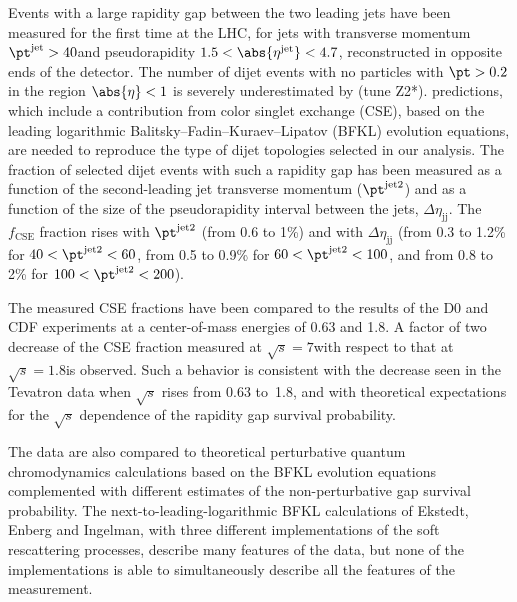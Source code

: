 \documentclass[11pt,twoside,a4paper,cmspaper,final,collab]{cms-tdr}
\begin{document}
Events with a large rapidity gap between the two leading jets have been measured for the first time at the LHC, for jets with transverse momentum $\pt^{\text{jet}}>40$\GeV and pseudorapidity $1.5<\abs{\eta^{\text{jet}}}<4.7$, reconstructed in opposite ends of the detector. The number of dijet events with no particles with $\pt>0.2$\GeV in the region $\abs{\eta}<1$ is severely underestimated by  (tune Z2*).  predictions, which include a contribution from color singlet exchange (CSE), based on the leading logarithmic Balitsky--Fadin--Kuraev--Lipatov (BFKL) evolution equations, are needed to reproduce the type of dijet topologies selected in our analysis. The fraction of selected dijet events with  such a rapidity gap has been measured as a function of the second-leading jet transverse momentum ($\pt^\text{jet2}$) and as a function of the size of the pseudorapidity interval between the jets, $\Delta\eta_\mathrm{jj}$. The $f_\mathrm{CSE}$  fraction rises with $\pt^\text{jet2}$ (from 0.6 to 1\%) and with $\Delta\eta_\mathrm{jj}$ (from 0.3 to 1.2\% for $40<\pt^\text{jet2}<60$\GeV, from 0.5 to 0.9\% for $60<\pt^\text{jet2}<100$\GeV, and from 0.8 to 2\% for $100<\pt^\text{jet2}<200$\GeV).

The measured CSE fractions have been compared to the results of the D0 and CDF experiments at a center-of-mass energies of 0.63 and 1.8\TeV. A factor of two decrease of the CSE fraction measured at $\sqrt{s} = 7$\TeV with respect to that at $\sqrt{s} = 1.8$\TeV is observed. Such a behavior is consistent with the decrease seen in the Tevatron data when $\sqrt{s}$ rises from 0.63 to~1.8\TeV, and with theoretical expectations for the $\sqrt{s}$ dependence of the rapidity gap survival probability.

The data are also compared to theoretical perturbative quantum chromodynamics calculations based on the BFKL evolution equations complemented with different estimates of the non-perturbative gap survival probability. The next-to-leading-logarithmic BFKL calculations of Ekstedt, Enberg and Ingelman, with three different implementations of the soft rescattering processes, describe many features of the data, but none of the implementations is able to simultaneously describe all the features of the measurement.
\end{document}
